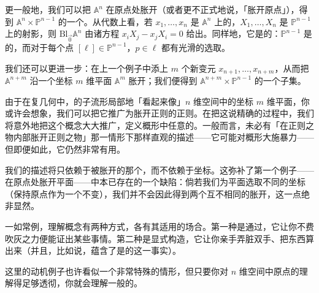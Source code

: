 更一般地，我们可以把 $\mathbb{A}^n$ 在原点处胀开（或者更不正式地说，「胀开原点」），得到 $\mathbb{A}^n\times\mathbb{P}^{n-1}$ 的一个\trSubvariety。从代数上看，若 $x_1,\dots,x_n$ 是 $\mathbb{A}^n$ 上的\trCoordinate，$X_1,\dots,X_n$ 是 $\mathbb{P}^{n-1}$ 上的射影\trCoordinate，则\trBlowup{} $\mathrm{Bl}_{\vec 0}\mathbb{A}^n$ 由诸方程 $x_iX_j-x_jX_i=0$ 给出。同样地，它是\trSmooth{}的：$\mathbb{P}^{n-1}$ 是\trSmooth{}的，而对于每个点 $[\ell]\in\mathbb{P}^{n-1}$，$p\in\ell$ 都有光滑的选取。

我们还可以更进一步：在上一个例子中添上 $m$ 个新变元 $x_{n+1},\dots,x_{n+m}$，从而把 $\mathbb{A}^{n+m}$ 沿一个坐标 $m$ 维平面 $\mathbb{A}^m$ 胀开；我们便得到 $\mathbb{A}^{n+m}\times\mathbb{P}^{n-1}$ 的一个子集。

由于在复几何中，\trManifold{}的子流形局部地「看起来像」$n$ 维空间中的坐标 $m$ 维平面，你或许会想象，我们可以把它推广为胀开正则\trVariety{}的正则\trSubvariety。在把这说精确的过程中，我们将意外地把这个概念大大推广，定义概形中任意\trFiniteType{}\trQC{}\trIdealSheaf{}的\trBlowup。一般而言，\trBlowup{}未必有「在正则之物内部胀开正则之物」那一情形下那样直观的描述——它可能对概形大施暴力——但即便如此，它仍然非常有用。

我们的描述将只依赖于被胀开的那个\trClosedSubscheme，而不依赖于坐标。这弥补了第一个例子——在原点处胀开平面——中本已存在的一个缺陷：倘若我们为平面选取不同的坐标（保持原点作为一个\trClosedSubscheme{}不变），我们并不会因此得到两个互不相同的胀开，这一点绝非显然。

一如常例，理解\trBlowup{}概念有两种方式，各有其适用的场合。第一种是通过\trUniversalProperty，它让你不费吹灰之力便能证出某些事情。第二种是显式构造，它让你亲手弄脏双手、把东西算出来（并且，比如说，蕴含了\trBlowup{}\trMorphism{}是\trProjective{}的这一事实）。

这里的动机例子也许看似一个非常特殊的情形，但只要你对 $n$ 维空间中原点的\trBlowup{}理解得足够透彻，你就会理解一般的\trBlowup。
